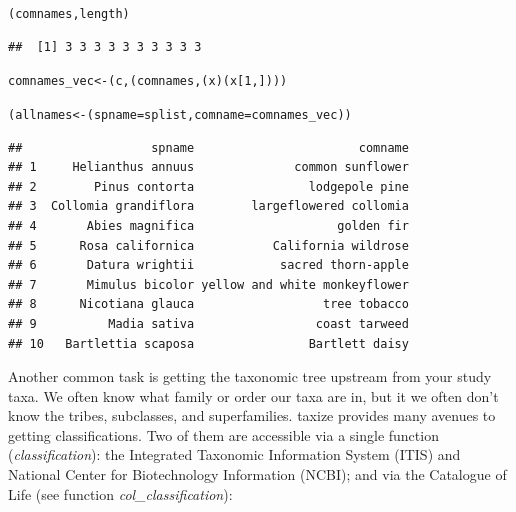 \begin{knitrout}
\begin{kframe}
{\ttfamily\noindent\itshape\color{messagecolor}{\#\# http://www.itis.gov/ITISWebService/services/ITISService/getCommonNamesFromTSN?tsn=38040}}

{\ttfamily\noindent\itshape\color{messagecolor}{\#\# http://www.itis.gov/ITISWebService/services/ITISService/getCommonNamesFromTSN?tsn=36822}}\begin{alltt}

(comnames, length)
\end{alltt}
\begin{verbatim}
##  [1] 3 3 3 3 3 3 3 3 3 3
\end{verbatim}
\begin{alltt}

comnames_vec <- (c, (comnames, (x) (x[1, ])))

(allnames <- (spname = splist, comname = comnames_vec))
\end{alltt}
\begin{verbatim}
##                  spname                       comname
## 1     Helianthus annuus              common sunflower
## 2        Pinus contorta                lodgepole pine
## 3  Collomia grandiflora        largeflowered collomia
## 4       Abies magnifica                    golden fir
## 5      Rosa californica           California wildrose
## 6       Datura wrightii            sacred thorn-apple
## 7       Mimulus bicolor yellow and white monkeyflower
## 8      Nicotiana glauca                  tree tobacco
## 9          Madia sativa                 coast tarweed
## 10   Bartlettia scaposa                Bartlett daisy
\end{verbatim}
\end{kframe}
\end{knitrout}


Another common task is getting the taxonomic tree upstream from your study taxa. We often know what family or order our taxa are in, but it we often don't know the tribes, subclasses, and superfamilies. taxize provides many avenues to getting classifications. Two of them are accessible via a single function (\emph{classification}): the Integrated Taxonomic Information System (ITIS) and National Center for Biotechnology Information (NCBI); and via the Catalogue of Life (see function \emph{col\_classification}):


